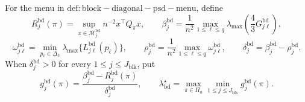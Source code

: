 For the menu in \(\mathrm{def:block-diagonal-psd-menu}\), define
\[
R_j^{\mathrm{bd}}(\pi)
=\sup_{x\in\mathcal M_j^{\mathrm{bd}}}n^{-2}x^\top Q_\pi x,
\qquad
\beta_j^{\mathrm{bd}}
=\frac1{n^2}\max_{1\le\ell\le q}
\lambda_{\max}\!\left(\frac43G^{\mathrm{bd}}_{j\ell}\right),
\]
\[
\omega^{\mathrm{bd}}_{j\ell}
=\min_{p_\ell\in\Delta_3}\lambda_{\max}\{L^{\mathrm{bd}}_{j\ell}(p_\ell)\},
\qquad
\rho_j^{\mathrm{bd}}
=\frac1{n^2}\max_{1\le\ell\le q}\omega^{\mathrm{bd}}_{j\ell},
\qquad
\delta_j^{\mathrm{bd}}=\beta_j^{\mathrm{bd}}-\rho_j^{\mathrm{bd}}.
\]
When \(\delta_j^{\mathrm{bd}}>0\) for every \(1\le j\le J_{\mathrm{blk}}\), put
\[
g_j^{\mathrm{bd}}(\pi)
=\frac{\beta_j^{\mathrm{bd}}-R_j^{\mathrm{bd}}(\pi)}{\delta_j^{\mathrm{bd}}},
\qquad
\lambda_{\mathrm{bd}}^\star
=\max_{\pi\in\Pi_n}\min_{1\le j\le J_{\mathrm{blk}}}g_j^{\mathrm{bd}}(\pi).
\]